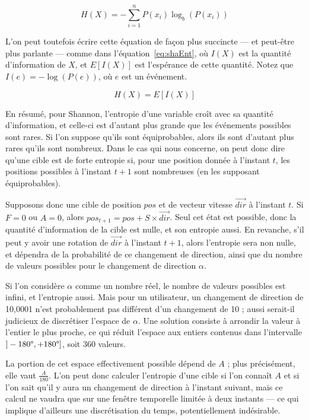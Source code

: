 	\begin{equation}
		\label{eq:shannonEntropy}
		H(X) = -\sum_{i=1}^{n}P(x_{i})\log_{b}\left(P(x_{i})\right)
	\end{equation}
	
	L'on peut toutefois écrire cette équation de façon plus succincte --- et peut-être plus parlante --- comme dans l'équation~\ref{eq:shaEnt}, où $I(X)$ est la quantité d'information de $X$, et $E[I(X)]$ est l'espérance de cette quantité. Notez que $I(e) = -\log\left(P(e)\right)$, où $e$ est un événement.
	
	\begin{equation}
		\label{eq:shaEnt}
		H(X) = E[I(X)]
	\end{equation}
	
	En résumé, pour Shannon, l'entropie d'une variable croît avec sa quantité d'information, et celle-ci est d'autant plus grande que les événements possibles sont rares. Si l'on suppose qu'ils sont équiprobables, alors ils sont d'autant plus rares qu'ils sont nombreux. Dans le cas qui nous concerne, on peut donc dire qu'une cible est de forte entropie si, pour une position donnée à l'instant $t$, les positions possibles à l'instant $t+1$ sont nombreuses (en les supposant équiprobables).
	
	Supposons donc une cible de position $pos$ et de vecteur vitesse $\vec{dir}$ à l'instant $t$. Si $F=0$ ou $A=0$, alors $pos_{t+1} = pos + S \times \vec{dir}$. Seul cet état est possible, donc la quantité d'information de la cible est nulle, et son entropie aussi. En revanche, s'il peut y avoir une rotation de $\vec{dir}$ à l'instant $t+1$, alors l'entropie sera non nulle, et dépendra de la probabilité de ce changement de direction, ainsi que du nombre de valeurs possibles pour le changement de direction $\alpha$.
	
	Si l'on considère $\alpha$ comme un nombre réel, le nombre de valeurs possibles est infini, et l'entropie aussi. Mais pour un utilisateur, un changement de direction de 10,0001\textdegree{} n'est probablement pas différent d'un changement de 10\textdegree{} ; aussi serait-il judicieux de discrétiser l'espace de $\alpha$. Une solution consiste à arrondir la valeur à l'entier le plus proche, ce qui réduit l'espace aux entiers contenus dans l'intervalle $]-180\degree{}, +180\degree{}]$, soit 360 valeurs.
	
	La portion de cet espace effectivement possible dépend de $A$ ; plus précisément, elle vaut $\frac{A}{180}$. L'on peut donc calculer l'entropie d'une cible si l'on connaît $A$ et si l'on sait qu'il y aura un changement de direction à l'instant suivant, mais ce calcul ne vaudra que sur une fenêtre temporelle limitée à deux \og instants \fg{} --- ce qui implique d'ailleurs une discrétisation du temps, potentiellement indésirable.
	
